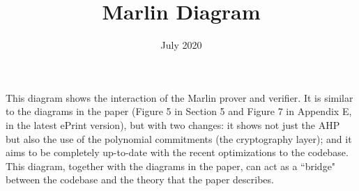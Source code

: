 \documentclass{article}
\title{Marlin Diagram}
\date{July 2020}
\begin{document}
\newcommand{\cm}[1]{\ensuremath{\mathsf{cm}_{#1}}}
\newcommand{\vcm}[1]{\ensuremath{\mathsf{vcm}_{#1}}}
\newcommand{\s}{\ensuremath{\hat{s}}}
\newcommand{\w}{\ensuremath{\hat{w}}}
\newcommand{\z}{\ensuremath{\hat{z}}}
\newcommand{\za}{\ensuremath{\hat{z}_A}}
\newcommand{\zb}{\ensuremath{\hat{z}_B}}
\newcommand{\zc}{\ensuremath{\hat{z}_C
}}
\newcommand{\zm}{\ensuremath{\hat{z}_M}}

\newcommand{\val}{\ensuremath{\mathsf{val}}}
\newcommand{\row}{\ensuremath{\mathsf{row}}}
\newcommand{\col}{\ensuremath{\mathsf{col}}}
\newcommand{\rowcol}{\ensuremath{\mathsf{rowcol}}}

\newcommand{\hval}{\ensuremath{\hat{\val}}}
\newcommand{\hrow}{\ensuremath{\hat{\row}}}
\newcommand{\hcol}{\ensuremath{\hat{\col}}}
\newcommand{\hrowcol}{\ensuremath{\hat{\rowcol}}}

\newcommand{\bb}{\ensuremath{\mathsf{b}}}
\newcommand{\denom}{\ensuremath{\mathsf{denom}}}

\newcommand{\sumcheckinner}{\mathsf{sumcheck}
_{\mathsf{inner}}}
\newcommand{\sumcheckouter}{\mathsf{sumcheck}_{\mathsf{outer}}}

\newcommand{\Prover}{\mathcal{P}}
\newcommand{\Verifier}{\mathcal{V}}

\newcommand{\F}{\mathbb{F}}

\newcommand{\DomainA}{H}
\newcommand{\DomainB}{K}

\newcommand{\vPoly}[1]{\ensuremath{v_{#1}}}


This diagram shows the interaction of the Marlin prover and verifier. It is similar to the diagrams in the paper (Figure 5 in Section 5 and Figure 7 in Appendix E, in the latest ePrint version), but with two changes: it shows not just the AHP but also the use of the polynomial commitments (the cryptography layer); and it aims to be completely up-to-date with the recent optimizations to the codebase. This diagram, together with the diagrams in the paper, can act as a ``bridge" between the codebase and the theory that the paper describes.
\end{document}

